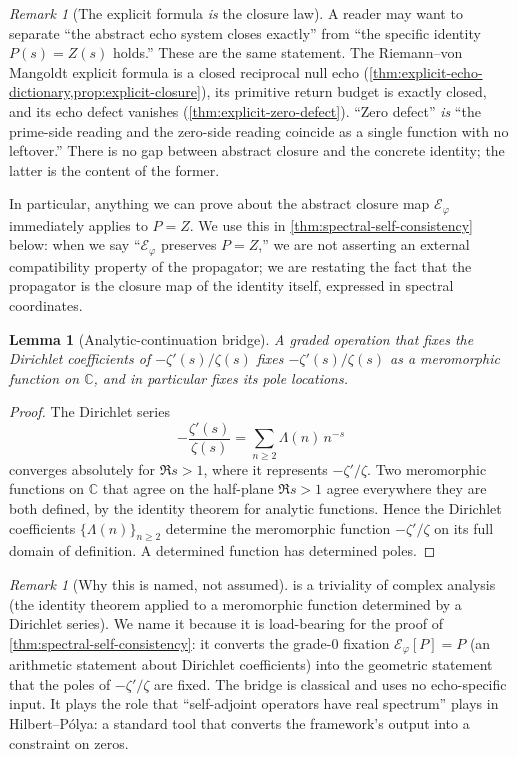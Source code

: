 \documentclass[11pt,a4paper]{article}
\theoremstyle{plain}
\newtheorem{lemma}[theorem]{Lemma}
\theoremstyle{definition}
\theoremstyle{remark}
\newtheorem{remark}[theorem]{Remark}
\numberwithin{equation}{section}
\newcommand{\vp}{\varphi}
\begin{document}
\begin{remark}[The explicit formula \emph{is} the closure law]
\label{rmk:identity-is-closure}
A reader may want to separate ``the abstract echo system closes
exactly'' from ``the specific identity \(P(s)=Z(s)\) holds.''
These are the same statement.  The Riemann--von Mangoldt explicit
formula is a closed reciprocal null echo
(\cref{thm:explicit-echo-dictionary,prop:explicit-closure}),
its primitive return budget is exactly closed, and its echo defect
vanishes (\cref{thm:explicit-zero-defect}).  ``Zero defect''
\emph{is} ``the prime-side reading and the zero-side reading
coincide as a single function with no leftover.''  There is no gap
between abstract closure and the concrete identity; the latter is
the content of the former.

In particular, anything we can prove about the abstract closure
map \(\mathcal{E}_\vp\) immediately applies to \(P=Z\).  We use
this in \cref{thm:spectral-self-consistency} below: when we say
``\(\mathcal{E}_\vp\) preserves \(P=Z\),'' we are not asserting an
external compatibility property of the propagator; we are
restating the fact that the propagator is the closure map of the
identity itself, expressed in spectral coordinates.
\end{remark}

\begin{lemma}[Analytic-continuation bridge]
\label{lem:ac-bridge}
A graded operation that fixes the Dirichlet coefficients of
\(-\zeta'(s)/\zeta(s)\) fixes \(-\zeta'(s)/\zeta(s)\) as a
meromorphic function on \(\mathbb{C}\), and in particular fixes its
pole locations.
\end{lemma}

\begin{proof}
The Dirichlet series
\[
  -\frac{\zeta'(s)}{\zeta(s)}=\sum_{n\ge2}\Lambda(n)\,n^{-s}
\]
converges absolutely for \(\Re s>1\), where it represents
\(-\zeta'/\zeta\).  Two meromorphic functions on \(\mathbb{C}\)
that agree on the half-plane \(\Re s>1\) agree everywhere they are
both defined, by the identity theorem for analytic functions.
Hence the Dirichlet coefficients \(\{\Lambda(n)\}_{n\ge2}\)
determine the meromorphic function \(-\zeta'/\zeta\) on its full
domain of definition.  A determined function has determined poles.
\end{proof}

\begin{remark}[Why this is named, not assumed]
\label{rmk:ac-bridge-named}
 is a triviality of complex analysis (the
identity theorem applied to a meromorphic function determined by a
Dirichlet series).  We name it because it is load-bearing for the
proof of \cref{thm:spectral-self-consistency}: it converts the
grade-0 fixation \(\mathcal{E}_\vp[P]=P\) (an arithmetic statement
about Dirichlet coefficients) into the geometric statement that
the poles of \(-\zeta'/\zeta\) are fixed.  The bridge is classical
and uses no echo-specific input.  It plays the role that
``self-adjoint operators have real spectrum'' plays in
Hilbert--P\'olya: a standard tool that converts the framework's
output into a constraint on zeros.
\end{remark}
\end{document}
